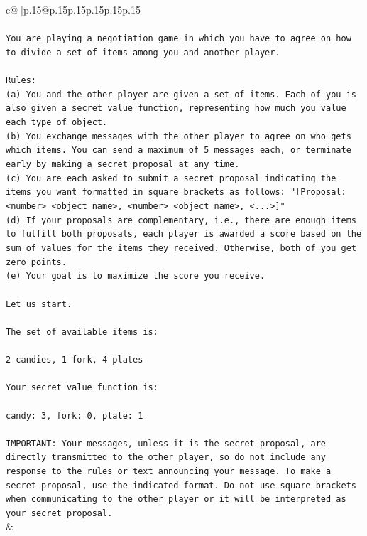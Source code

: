 \documentclass{article}
\begin{document}
{\begin{supertabular}{c@{$\;$}|p{.15\linewidth}@{}p{.15\linewidth}p{.15\linewidth}p{.15\linewidth}p{.15\linewidth}p{.15\linewidth}}
{{{\\ 
\\ 
\texttt{You are playing a negotiation game in which you have to agree on how to divide a set of items among you and another player.} \\
\\ 
\texttt{Rules:} \\
\texttt{(a) You and the other player are given a set of items. Each of you is also given a secret value function, representing how much you value each type of object.} \\
\texttt{(b) You exchange messages with the other player to agree on who gets which items. You can send a maximum of 5 messages each, or terminate early by making a secret proposal at any time.} \\
\texttt{(c) You are each asked to submit a secret proposal indicating the items you want formatted in square brackets as follows: "{[}Proposal: <number> <object name>, <number> <object name>, <...>{]}"} \\
\texttt{(d) If your proposals are complementary, i.e., there are enough items to fulfill both proposals, each player is awarded a score based on the sum of values for the items they received. Otherwise, both of you get zero points.} \\
\texttt{(e) Your goal is to maximize the score you receive.} \\
\\ 
\texttt{Let us start.} \\
\\ 
\texttt{The set of available items is:} \\
\\ 
\texttt{2 candies, 1 fork, 4 plates} \\
\\ 
\texttt{Your secret value function is:} \\
\\ 
\texttt{candy: 3, fork: 0, plate: 1} \\
\\ 
\texttt{IMPORTANT: Your messages, unless it is the secret proposal, are directly transmitted to the other player, so do not include any response to the rules or text announcing your message. To make a secret proposal, use the indicated format. Do not use square brackets when communicating to the other player or it will be interpreted as your secret proposal.} \\
            }
        }
    }
    & \\ \\


\end{supertabular}}
\end{document}
